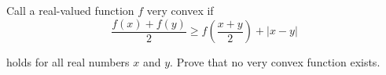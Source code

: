 Call a real-valued function $ f$ very convex if\[ \frac {f(x) + f(y)}{2} \ge f\left(\frac {x + y}{2}\right) + |x - y|

\]

holds for all real numbers $ x$ and $ y$. Prove that no very convex function exists.
